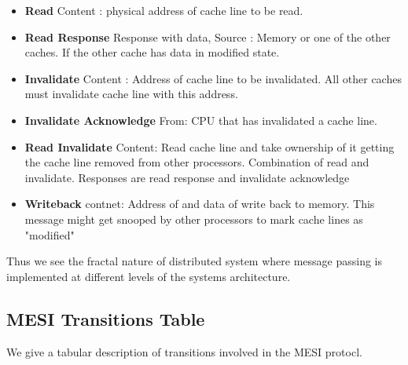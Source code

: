 \documentclass{article}
\begin{document}
\begin{itemize}
\item \textbf{Read} Content : physical address of cache line to be
  read.
\item \textbf{Read Response} Response with data, Source : Memory or
  one of the other caches. If the other cache has data in modified
  state.
\item \textbf{Invalidate} Content : Address of cache line to be
  invalidated. All other caches must invalidate cache line with this
  address.

\item \textbf{Invalidate Acknowledge} From: CPU that has invalidated a
  cache line.

\item \textbf{Read Invalidate} Content: Read cache line and take
  ownership of it getting the cache line removed from other
  processors. Combination of read and invalidate. Responses are read
  response and invalidate acknowledge

\item \textbf{Writeback} contnet: Address of and data of write back to
  memory. This message might get snooped by other processors to mark
  cache lines as "modified"  
\end{itemize}

Thus we see the fractal nature of distributed system where message
passing is implemented at different levels of the systems
architecture.


\subsection{MESI Transitions Table}

We give a tabular description of transitions involved in the MESI
protocl.
\end{document}
